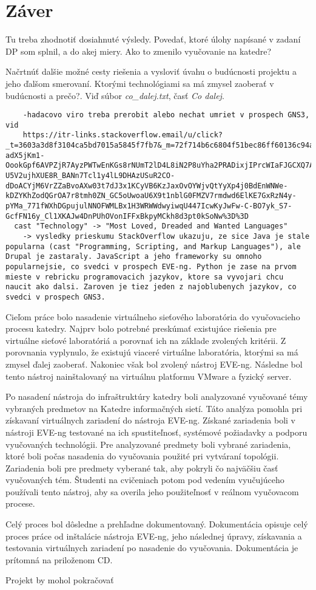 \chapter{Záver}

Tu treba zhodnotiť dosiahnuté výsledy. Povedať, ktoré úlohy napísané v zadaní DP som splnil, a do akej miery. Ako to zmenilo vyučovanie na katedre?

Načrtnúť dalšie možné cesty riešenia a vysloviť úvahu o budúcnosti projektu a jeho ďalšom smerovaní. Ktorými technológiami sa má zmysel zaoberať v budúcnosti a prečo?. Viď súbor \emph{co\_dalej.txt}, časť \emph{Co dalej}.

\begin{verbatim}
    -hadacovo viro treba prerobit alebo nechat umriet v prospech GNS3, vid
    https://itr-links.stackoverflow.email/u/click?_t=3603a3d8f3104ca5bd7015a5845f7fb7&_m=72f714b6c6804f51bec86ff60136c94a&_e=khSYWjE_zs7-adX5jKm1-OookGpf6AVPZjR7AyzPWTwEnKGs8rNUmT2lD4L8iN2P8uYha2PRADixjIPrcWIaFJGCXQ7AyX0cYfKArrRAGqP2_o0jr270rA-U5V2ujhXUE8R_BANn7Tcl1y4lL9DHAzUSuR2CO-dDoACYjM6VrZZaBvoAXw03t7dJ3x1KCyVB6KzJaxOvOYWjvQtYyXp4j0BdEnWNWe-kDZYKhZodQGrOA7r8tmh0ZN_GC5oUwoaU6X9t1nblG0FMZV7rmdwd6ElKE7GxRzN4y-pYMa_771fWXhDGpujulNNOFWMLBx1H3WRWWdwyiwqU447IcwKyJwFw-C-BO7yk_S7-GcfFN16y_Cl1XKAJw4DnPUhOVonIFFxBkpyMCkh8d3pt0kSoNw%3D%3D
  cast "Technology" -> "Most Loved, Dreaded and Wanted Languages"
    -> vysledky prieskumu StackOverflow ukazuju, ze sice Java je stale popularna (cast "Programming, Scripting, and Markup Languages"), ale Drupal je zastaraly. JavaScript a jeho frameworky su omnoho popularnejsie, co svedci v prospech EVE-ng. Python je zase na prvom mieste v rebricku programovacich jazykov, ktore sa vyvojari chcu naucit ako dalsi. Zaroven je tiez jeden z najoblubenych jazykov, co svedci v prospech GNS3.
\end{verbatim}






Cieľom práce bolo nasadenie virtuálneho sieťového laboratória do vyučovacieho procesu katedry. Najprv bolo potrebné preskúmať existujúce riešenia pre virtuálne sieťové laboratóriá a porovnať ich na základe zvolených kritérii. Z porovnania vyplynulo, že existujú viaceré virtuálne laboratória, ktorými sa má zmysel ďalej zaoberať. Nakoniec však bol zvolený nástroj EVE-ng. Následne bol tento nástroj nainštalovaný na virtuálnu platformu VMware a fyzický server.

Po nasadení nástroja do infraštruktúry katedry boli analyzované vyučované témy vybraných predmetov na Katedre informačných sietí. Táto analýza pomohla pri získavaní virtuálnych zariadení do nástroja EVE-ng. Získané zariadenia boli v nástroji EVE-ng testované na ich spustiteľnosť, systémové požiadavky a podporu vyučovaných technológii. Pre analyzované predmety boli vybrané zariadenia, ktoré boli počas nasadenia do vyučovania použité pri vytváraní topológii. Zariadenia boli pre predmety vyberané tak, aby pokryli čo najväčšiu časť vyučovaných tém. Študenti na cvičeniach potom pod vedením vyučujúceho používali tento nástroj, aby sa overila jeho použiteľnosť v reálnom vyučovacom procese.

Celý proces bol dôsledne a prehľadne dokumentovaný. Dokumentácia opisuje celý proces práce od inštalácie nástroja EVE-ng, jeho následnej úpravy, získavania a testovania virtuálnych zariadení po nasadenie do vyučovania. Dokumentácia je prítomná na priloženom CD.

Projekt by mohol pokračovať 